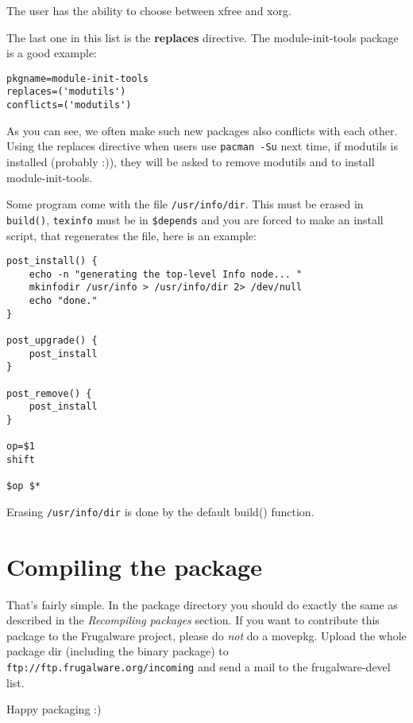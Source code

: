 The user has the ability to choose between xfree and xorg.

The last one in this list is the \textbf{replaces} directive. The module-init-tools package is a good example:
\begin{verbatim}
pkgname=module-init-tools
replaces=('modutils')
conflicts=('modutils')
\end{verbatim}

As you can see, we often make such new packages also conflicts with each other. Using the replaces directive when users use {\tt pacman -Su} next time, if modutils is installed (probably :)), they will be asked to remove modutils and to install module-init-tools.

Some program come with the file {\tt /usr/info/dir}. This must be erased in {\tt build()}, {\tt texinfo} must be in {\tt \$depends} and you are forced to make an install script, that regenerates the file, here is an example:
\begin{verbatim}
post_install() {
	echo -n "generating the top-level Info node... "
	mkinfodir /usr/info > /usr/info/dir 2> /dev/null
	echo "done."
}

post_upgrade() {
	post_install
}

post_remove() {
	post_install
}

op=$1
shift

$op $*
\end{verbatim}

Erasing {\tt /usr/info/dir} is done by the default build() function.

\section{Compiling the package}

That's fairly simple. In the package directory you should do exactly the same as described in the \textit{Recompiling packages} section. If you want to contribute this package to the Frugalware project, please do \textit{not} do a movepkg. Upload the whole package dir (including the binary package) to {\tt ftp://ftp.frugalware.org/incoming} and send a mail to the frugalware-devel list.

Happy packaging :)
